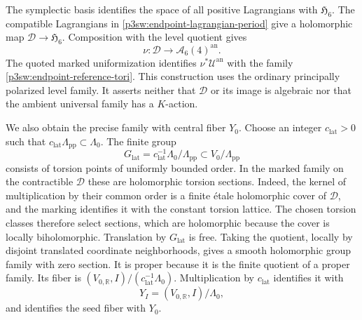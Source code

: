 \documentclass[11pt]{article}
\newcommand{\R}{\mathbb R}
\numberwithin{equation}{section}
\begin{document}
The symplectic basis identifies the space of all positive Lagrangians
with \(\mathfrak H_6\).  The compatible Lagrangians in
\eqref{p3sw:endpoint-lagrangian-period} give a holomorphic map
\(\mathscr D\to\mathfrak H_6\).  Composition with the level quotient gives
\begin{equation}
\label{p3sw:endpoint-level-period-map}
 \nu:\mathscr D\longrightarrow\mathscr A_6(4)^{\mathrm{an}}.
\end{equation}
The quoted marked uniformization identifies
\(\nu^*\mathscr U^{\mathrm{an}}\) with the family
\eqref{p3sw:endpoint-reference-tori}.  This construction uses the
ordinary principally polarized level family.  It asserts neither
that \(\mathscr D\) or its image is algebraic nor that the ambient
universal family has a \(K\)-action.

We also obtain the precise family with central fiber \(Y_0\).
Choose an integer \(c_{\mathrm{lat}}>0\) such that
\(c_{\mathrm{lat}}\Lambda_{\mathrm{pp}}\subset\Lambda_0\).  The
finite group
\[
 G_{\mathrm{lat}}=
  c_{\mathrm{lat}}^{-1}\Lambda_0/\Lambda_{\mathrm{pp}}
       \subset V_0/\Lambda_{\mathrm{pp}}
\]
consists of torsion points of uniformly bounded order.  In the
marked family on the contractible \(\mathscr D\) these are
holomorphic torsion sections.  Indeed, the kernel of multiplication
by their common order is a finite \'etale holomorphic cover of
\(\mathscr D\), and the marking identifies it with the constant
torsion lattice.  The chosen torsion classes therefore select
sections, which are holomorphic because the cover is locally
biholomorphic.  Translation by
\(G_{\mathrm{lat}}\) is free.  Taking the quotient, locally by
disjoint translated coordinate neighborhoods, gives a smooth
holomorphic group family with zero section.  It is proper because
it is the finite quotient of a proper family.  Its fiber is
\((V_{0,\R},I)/(c_{\mathrm{lat}}^{-1}\Lambda_0)\).  Multiplication
by \(c_{\mathrm{lat}}\) identifies it with
\begin{equation}
\label{p3sw:endpoint-seed-lattice-family}
 Y_I=(V_{0,\R},I)/\Lambda_0,
\end{equation}
and identifies the seed fiber with \(Y_0\).
\end{document}
